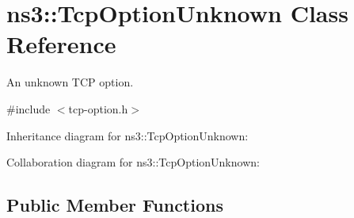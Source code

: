 \hypertarget{classns3_1_1TcpOptionUnknown}{}\section{ns3\+:\+:Tcp\+Option\+Unknown Class Reference}
\label{classns3_1_1TcpOptionUnknown}


An unknown T\+CP option.  




{\ttfamily \#include $<$tcp-\/option.\+h$>$}



Inheritance diagram for ns3\+:\+:Tcp\+Option\+Unknown\+:


Collaboration diagram for ns3\+:\+:Tcp\+Option\+Unknown\+:
\subsection*{Public Member Functions}
